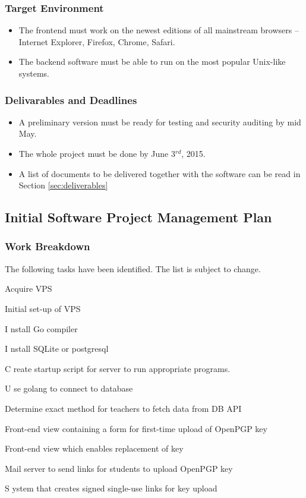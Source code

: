 \documentclass[11pt,a4paper]{article}
\let\OldItem\item
\newcommand{\SubItemStart}[1]{%
    \let\item\SubItemEnd
    \begin{SubItemList}[resume]%
        \OldItem #1%
}
\newcommand{\SubItemMiddle}[1]{%
    \OldItem #1%
}
\newcommand{\SubItemEnd}[1]{%
    \end{SubItemList}%
    \let\item\OldItem
    \item #1%
}
\newcommand*{\SubItem}[1]{%
    \let\SubItem\SubItemMiddle%
    \SubItemStart{#1}%
}%
\begin{document}
\subsubsection{Target Environment}
\begin{itemize}
\item The frontend must work on the newest editions of all mainstream browsers -- Internet Explorer, Firefox, Chrome, Safari.
\item The backend software must be able to run on the most popular Unix-like systems.
\end{itemize}
\subsubsection{Delivarables and Deadlines}\label{sec:deadlines}
\begin{itemize}
\item A preliminary version must be ready for testing and security auditing by mid May.
\item The whole project must be done by June 3$^{rd}$, 2015.
\item A list of documents to be delivered together with the software can be read in Section \ref{sec:deliverables}
\end{itemize}
\subsection{Initial Software Project Management Plan}
\subsubsection{Work Breakdown}
The following tasks have been identified. The list is subject to change.
\begin{itemize}
\item Acquire VPS
\item Initial set-up of VPS
\SubItem Install Go compiler
\SubItem Install SQLite or postgresql
\SubItem Create startup script for server to run appropriate programs.
\item Use golang to connect to database
\item Determine exact method for teachers to fetch data from DB API
\item Front-end view containing a form for first-time upload of OpenPGP key
\item Front-end view which enables replacement of key
\item Mail server to send links for students to upload OpenPGP key
\SubItem System that creates signed single-use links for key upload
\end{itemize}
\end{document}
